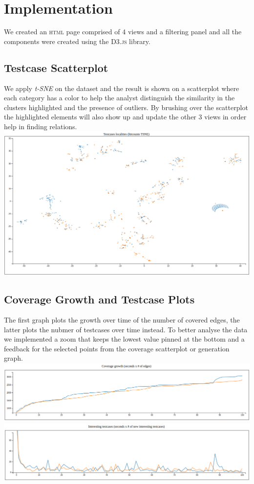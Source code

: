 \documentclass[conference,compsoc]{IEEEtran}
\begin{document}

\section{Implementation}

We created an \textsc{html} page comprised of 4 views and a filtering panel and all the components were created using the \textsc{D3.js} library.
\subsection{Testcase Scatterplot}

We apply \textit{t-SNE} on the dataset and the result is shown on a scatterplot where each category has a color to help the analyst distinguish the similarity in the clusters highlighted and the presence of outliers.
By brushing over the scatterplot the highlighted elements will also show up and update the other 3 views in order help in finding relations.
\includegraphics[scale=0.2]{img/scatterplot}

\subsection{Coverage Growth and Testcase Plots}
The first graph plots the growth over time of the number of covered edges, the latter plots the nubmer of testcases over time instead.
To better analyse the data we implemented a zoom that keeps the lowest value pinned at the bottom and a feedback for the selected points from the coverage scatterplot or generation graph.
\includegraphics[scale=0.3]{img/coverage}
\includegraphics[scale=0.3]{img/inputs}
\end{document}
